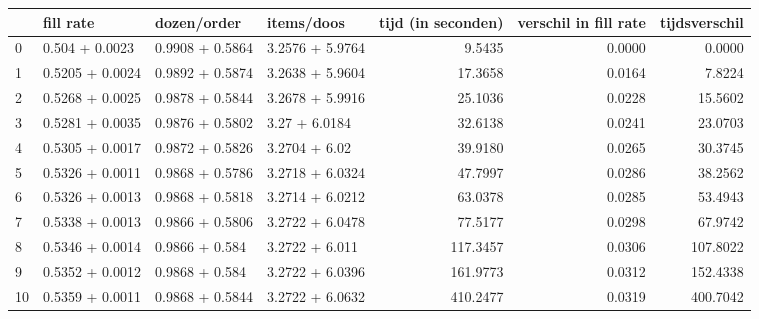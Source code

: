 \begin{tabular}{llllrrr}
\toprule
{} &        fill rate &      dozen/order &       items/doos &  tijd (in seconden) &  verschil in fill rate &  tijdsverschil \\
\midrule
0  &   0.504 + 0.0023 &  0.9908 + 0.5864 &  3.2576 + 5.9764 &              9.5435 &                 0.0000 &         0.0000 \\
1  &  0.5205 + 0.0024 &  0.9892 + 0.5874 &  3.2638 + 5.9604 &             17.3658 &                 0.0164 &         7.8224 \\
2  &  0.5268 + 0.0025 &  0.9878 + 0.5844 &  3.2678 + 5.9916 &             25.1036 &                 0.0228 &        15.5602 \\
3  &  0.5281 + 0.0035 &  0.9876 + 0.5802 &    3.27 + 6.0184 &             32.6138 &                 0.0241 &        23.0703 \\
4  &  0.5305 + 0.0017 &  0.9872 + 0.5826 &    3.2704 + 6.02 &             39.9180 &                 0.0265 &        30.3745 \\
5  &  0.5326 + 0.0011 &  0.9868 + 0.5786 &  3.2718 + 6.0324 &             47.7997 &                 0.0286 &        38.2562 \\
6  &  0.5326 + 0.0013 &  0.9868 + 0.5818 &  3.2714 + 6.0212 &             63.0378 &                 0.0285 &        53.4943 \\
7  &  0.5338 + 0.0013 &  0.9866 + 0.5806 &  3.2722 + 6.0478 &             77.5177 &                 0.0298 &        67.9742 \\
8  &  0.5346 + 0.0014 &   0.9866 + 0.584 &   3.2722 + 6.011 &            117.3457 &                 0.0306 &       107.8022 \\
9  &  0.5352 + 0.0012 &   0.9868 + 0.584 &  3.2722 + 6.0396 &            161.9773 &                 0.0312 &       152.4338 \\
10 &  0.5359 + 0.0011 &  0.9868 + 0.5844 &  3.2722 + 6.0632 &            410.2477 &                 0.0319 &       400.7042 \\
\bottomrule
\end{tabular}
